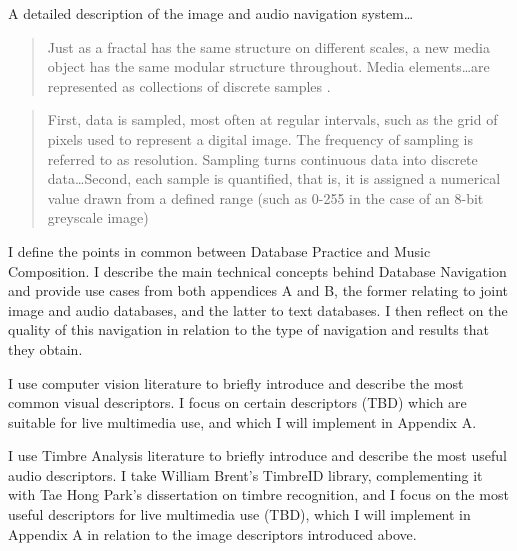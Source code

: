 A detailed description of the image and audio navigation system\dots


\begin{quote}
	Just as a fractal has the same structure on different scales, a new media object has the same modular structure throughout. Media elements\dots are represented as collections of discrete samples \parencite[30]{Man01:The}.
\end{quote}

\begin{quote}
	First, data is sampled, most often at regular intervals, such as the grid of pixels used to represent a digital image. The frequency of sampling is referred to as resolution. Sampling turns continuous data into discrete data\dots Second, each sample is quantified, that is, it is assigned a numerical value drawn from a defined range (such as 0-255 in the case of an 8-bit greyscale image) \parencite[28]{Man02:Old}
\end{quote}

I define the points in common between Database Practice and Music Composition. I describe the main technical concepts behind Database Navigation and provide use cases from both appendices A and B, the former relating to joint image and audio databases, and the latter to text databases. I then reflect on the quality of this navigation in relation to the type of navigation and results that they obtain.

I use computer vision literature to briefly introduce and describe the most common visual descriptors. I focus on certain descriptors (TBD) which are suitable for live multimedia use, and which I will implement in Appendix A.

I use Timbre Analysis literature to briefly introduce and describe the most useful audio descriptors. I take William Brent's TimbreID library, complementing it with Tae Hong Park's dissertation on timbre recognition, and I focus on the most useful descriptors for live multimedia use (TBD), which I will implement in Appendix A in relation to the image descriptors introduced above.